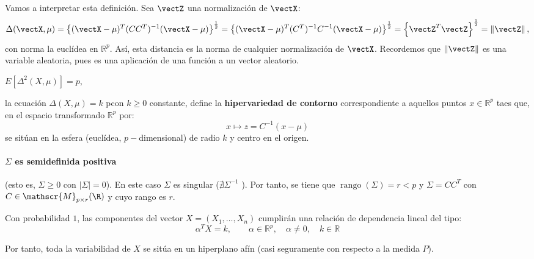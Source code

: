   Vamos a interpretar esta definición. Sea $\vectZ$ una normalización de $\vectX$:
  \[
  \Delta(\vectX,\mu) = \left\{ (\vectX-\mu)^T (CC^T)^{-1}(\vectX-\mu)\right\}^{\frac{1}{2}} = \left\{ (\vectX-\mu)^T (C^T)^{-1}C^{-1}(\vectX-\mu)\right\}^{\frac{1}{2}} = \left\{\vectZ^T \vectZ\right\}^{\frac{1}{2}} = \Vert \vectZ\Vert\,,
  \]
  con norma la euclídea en $\mathbb R^p$. Así, esta distancia es la norma de cualquier normalización de $\vectX$. Recordemos que $\Vert \vectZ\Vert$ es una variable aleatoria, pues es una aplicación de una función a un vector aleatorio.

  \begin{nprop}\hfill
    \begin{nlist}
    \item $E[\Delta^2 (X,\mu)] = p$,
    \item la ecuación $\Delta(X,\mu) = k$ pcon $k\geq 0$ constante, define la \textbf{hipervariedad de contorno} correspondiente a aquellos puntos $x \in \mathbb R^p$ taes que, en el espacio transformado $\mathbb R^p$ por:
      \[
      x \mapsto z = C^{-1}(x-\mu)
      \]
      se sitúan en la esfera (euclídea, $p-$dimensional) de radio $k$ y centro en el origen.
    \end{nlist}

  \end{nprop}

\paragraph{$\Sigma$ es \textbf{semidefinida positiva}} (esto es, $\Sigma \geq 0$ con $|\Sigma| = 0$).  En este caso $\Sigma$ es singular ($\nexists \Sigma ^{-1} $ ). Por tanto, se tiene que $\operatorname{rango}(\Sigma) = r < p$ y $\Sigma = C C^T$ con $C \in \mathscr{M}_{p\times r}(\R)$ y cuyo rango es $r$.\\

  \begin{ncor}
    Con probabilidad $1$, las componentes del vector $X = (X_1, \dots, X_n)$ cumplirán una relación de dependencia lineal del tipo:
    \[
    \alpha^T X = k, \quad \quad \alpha \in \mathbb R^p, \quad \alpha \ne 0 , \quad k \in \mathbb R
    \]
    
  Por tanto, toda la variabilidad de $X$ se sitúa en un hiperplano afín (casi seguramente con respecto a la medida $P$).
\end{ncor}

